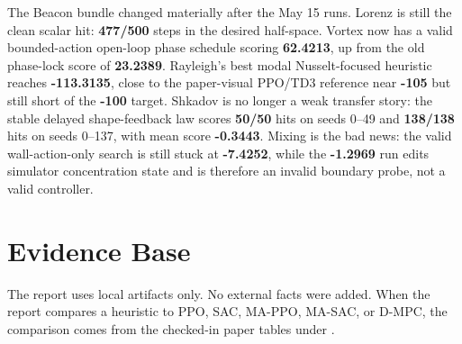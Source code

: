 \documentclass[10pt]{article}
\newcommand{\score}[1]{\textbf{#1}}
\begin{document}
The Beacon bundle changed materially after the May 15 runs. Lorenz is still the clean scalar hit: \score{477/500} steps in the desired half-space. Vortex now has a valid bounded-action open-loop phase schedule scoring \score{62.4213}, up from the old phase-lock score of \score{23.2389}. Rayleigh's best modal Nusselt-focused heuristic reaches \score{-113.3135}, close to the paper-visual PPO/TD3 reference near \score{-105} but still short of the \score{-100} target. Shkadov is no longer a weak transfer story: the stable delayed shape-feedback law scores \score{50/50} hits on seeds 0--49 and \score{138/138} hits on seeds 0--137, with mean score \score{-0.3443}. Mixing is the bad news: the valid wall-action-only search is still stuck at \score{-7.4252}, while the \score{-1.2969} run edits simulator concentration state and is therefore an invalid boundary probe, not a valid controller.

\section{Evidence Base}

The report uses local artifacts only. No external facts were added. When the report compares a heuristic to PPO, SAC, MA-PPO, MA-SAC, or D-MPC, the comparison comes from the checked-in paper tables under .
\end{document}
